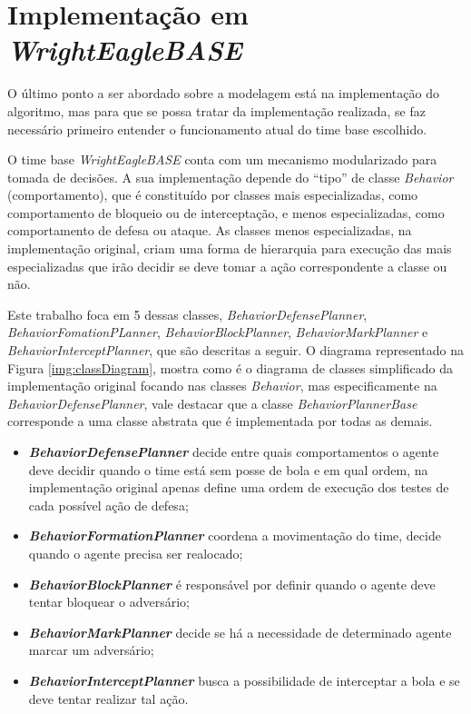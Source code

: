 \section{Implementação em \textit{WrightEagleBASE}}\label{implementacao}

O último ponto a ser abordado sobre a modelagem está na implementação do
algoritmo, mas para que se possa tratar da implementação realizada, se faz
necessário primeiro entender o funcionamento atual do time base escolhido.

O time base \textit{WrightEagleBASE} conta com um mecanismo modularizado para
tomada de decisões. A sua implementação depende do ``tipo'' de classe
\textit{Behavior} (comportamento), que é constituído por classes mais
especializadas, como comportamento de bloqueio ou de interceptação, e menos
especializadas, como comportamento de defesa ou ataque. As classes menos
especializadas, na implementação original, criam uma forma de hierarquia para
execução das mais especializadas que irão decidir se deve tomar a ação
correspondente a classe ou não. 

Este trabalho foca em 5 dessas classes, \textit{BehaviorDefensePlanner},
\textit{BehaviorFomationPLanner}, \textit{BehaviorBlockPlanner},
\textit{BehaviorMarkPlanner} e \textit{BehaviorInterceptPlanner}, que são
descritas a seguir. O diagrama representado na Figura \ref{img:classDiagram},
mostra como é o diagrama de classes simplificado da implementação original
focando nas classes \textit{Behavior}, mas especificamente na
\textit{BehaviorDefensePlanner}, vale destacar que a classe
\textit{BehaviorPlannerBase} corresponde a uma classe abstrata que é
implementada por todas as demais.

\begin{itemize}
    \item \textbf{\textit{BehaviorDefensePlanner}} decide entre quais
    comportamentos o agente deve decidir quando o time está sem posse de bola e
    em qual ordem, na implementação original apenas define uma ordem de execução
    dos testes de cada possível ação de defesa;
    \item \textbf{\textit{BehaviorFormationPlanner}} coordena a movimentação do
    time, decide quando o agente precisa ser realocado;
    \item \textbf{\textit{BehaviorBlockPlanner}} é responsável por definir
    quando o agente deve tentar bloquear o adversário;
    \item \textbf{\textit{BehaviorMarkPlanner}} decide se há a necessidade de
    determinado agente marcar um adversário;
    \item \textbf{\textit{BehaviorInterceptPlanner}} busca a possibilidade de
    interceptar a bola e se deve tentar realizar tal ação.
\end{itemize}

